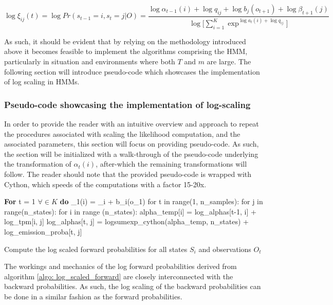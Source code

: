 \begin{equation}
    \log\xi_{ij}(t) = \log Pr(s_{t-1}=i, s_t=j|O) =
    \frac{\log\alpha_{t-1}(i) + \log q_{ij} + \log b_j(o_{t+1}) + \log \beta_{t+1}(j)}{\log\Big[\sum_{i=1}^K \exp^{\log a_t(i)+\log q_{ij}}\Big]}
    \label{eq: log xi}
\end{equation}

As such, it should be evident that by relying on the methodology introduced above it becomes feasible to implement the algorithms comprising the HMM, particularly in situation and environments where both $T$ and $m$ are large. The following section will introduce pseudo-code which showcases the implementation of log scaling in HMMs. 

\subsubsection{Pseudo-code showcasing the implementation of log-scaling}
In order to provide the reader with an intuitive overview and approach to repeat the procedures associated with scaling the likelihood computation, and the associated parameters, this section will focus on providing pseudo-code. As such, the section will be initialized with a walk-through of the pseudo-code underlying the transformation of $\alpha_t(i)$, after-which the remaining transformations will follow. The reader should note that the provided pseudo-code is wrapped with Cython, which speeds of the computations with a factor 15-20x.

\begin{algorithm}[H]
\textbf{For} t = 1 $\forall \in K$ \textbf{do} \;
\Indp
\log\alpha_{1}(i) = \log\delta_i + \log b_i(o_1) \;
\BlankLine
\Indm
{} \;
\Indp 
for t in range(1, n\_samples): \;
\Indp
for j in range(n\_states): \;
\Indp
for i in range (n\_states): \;
\BlankLine
\Indp
alpha\_temp[i] = log\_alphas[t-1, i] + log\_tpm[i, j] \;
\BlankLine
\Indm 
log\_alphas[t, j] = logsumexp\_cython(alpha\_temp, n\_states) + log\_emission\_proba[t, j] \;
\caption{Compute the log scaled forward probabilities for all states $S_i$ and observations $O_t$}
\label{algo: log_scaled_forward}
\end{algorithm}

The workings and mechanics of the log forward probabilities derived from algorithm \ref{algo: log_scaled_forward} are closely interconnected with the backward probabilities. As such, the log scaling of the backward probabilities can be done in a similar fashion as the forward probabilities.   

